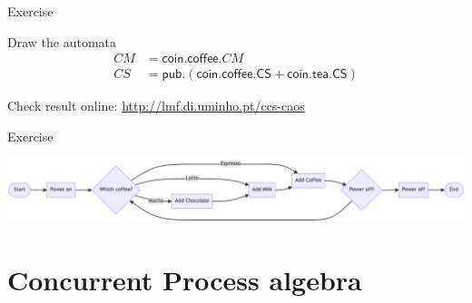 \documentclass[aspectratio=169]{beamer}
\begin{document}
\begin{slide}{Exercise}
  \centering
  \begin{exampleblock}{\exercise Draw the automata}
  \begin{align*}
    CM &= \mathsf{coin.coffee}.CM
    \\
    CS &= \mathsf{pub.(coin.coffee.CS + coin.tea.CS)}
  \end{align*}
\end{exampleblock}


{\Large Check result online: \url{http://lmf.di.uminho.pt/ccs-caos}}
\end{slide}


\begin{slide}{Exercise}
  \centering

  \includegraphics[width=1.0\textwidth]{images/coffee-flow.png}


\end{slide}




\section{Concurrent Process algebra}
\end{document}
